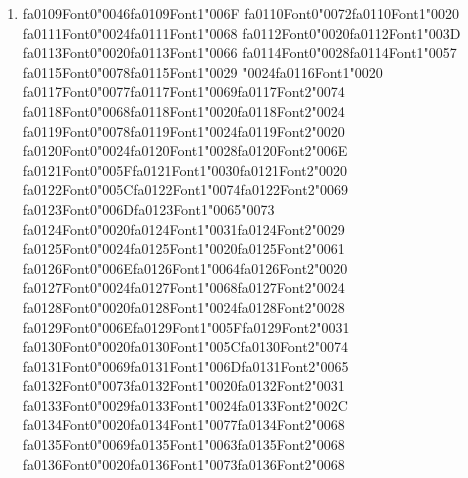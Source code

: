 \documentclass[12pt]{article}
\begin{document}
\begin{enumerate}[label=Q\arabic*.]
\begin{enumerate}[label=(\Alph*)]
    \item All future inputs
\end{enumerate}
\item {\csname fa0109Font0\endcsname\char"0046}{\csname fa0109Font1\endcsname\char"006F} {\csname fa0110Font0\endcsname\char"0072}{\csname fa0110Font1\endcsname\char"0020} {\csname fa0111Font0\endcsname\char"0024}{\csname fa0111Font1\endcsname\char"0068} {\csname fa0112Font0\endcsname\char"0020}{\csname fa0112Font1\endcsname\char"003D} {\csname fa0113Font0\endcsname\char"0020}{\csname fa0113Font1\endcsname\char"0066} {\csname fa0114Font0\endcsname\char"0028}{\csname fa0114Font1\endcsname\char"0057} {\csname fa0115Font0\endcsname\char"0078}{\csname fa0115Font1\endcsname\char"0029} {\char"0024}{\csname fa0116Font1\endcsname\char"0020} {\csname fa0117Font0\endcsname\char"0077}{\csname fa0117Font1\endcsname\char"0069}{\csname fa0117Font2\endcsname\char"0074} {\csname fa0118Font0\endcsname\char"0068}{\csname fa0118Font1\endcsname\char"0020}{\csname fa0118Font2\endcsname\char"0024} {\csname fa0119Font0\endcsname\char"0078}{\csname fa0119Font1\endcsname\char"0024}{\csname fa0119Font2\endcsname\char"0020} {\csname fa0120Font0\endcsname\char"0024}{\csname fa0120Font1\endcsname\char"0028}{\csname fa0120Font2\endcsname\char"006E} {\csname fa0121Font0\endcsname\char"005F}{\csname fa0121Font1\endcsname\char"0030}{\csname fa0121Font2\endcsname\char"0020} {\csname fa0122Font0\endcsname\char"005C}{\csname fa0122Font1\endcsname\char"0074}{\csname fa0122Font2\endcsname\char"0069} {\csname fa0123Font0\endcsname\char"006D}{\csname fa0123Font1\endcsname\char"0065}{\char"0073} {\csname fa0124Font0\endcsname\char"0020}{\csname fa0124Font1\endcsname\char"0031}{\csname fa0124Font2\endcsname\char"0029} {\csname fa0125Font0\endcsname\char"0024}{\csname fa0125Font1\endcsname\char"0020}{\csname fa0125Font2\endcsname\char"0061} {\csname fa0126Font0\endcsname\char"006E}{\csname fa0126Font1\endcsname\char"0064}{\csname fa0126Font2\endcsname\char"0020} {\csname fa0127Font0\endcsname\char"0024}{\csname fa0127Font1\endcsname\char"0068}{\csname fa0127Font2\endcsname\char"0024} {\csname fa0128Font0\endcsname\char"0020}{\csname fa0128Font1\endcsname\char"0024}{\csname fa0128Font2\endcsname\char"0028} {\csname fa0129Font0\endcsname\char"006E}{\csname fa0129Font1\endcsname\char"005F}{\csname fa0129Font2\endcsname\char"0031} {\csname fa0130Font0\endcsname\char"0020}{\csname fa0130Font1\endcsname\char"005C}{\csname fa0130Font2\endcsname\char"0074} {\csname fa0131Font0\endcsname\char"0069}{\csname fa0131Font1\endcsname\char"006D}{\csname fa0131Font2\endcsname\char"0065} {\csname fa0132Font0\endcsname\char"0073}{\csname fa0132Font1\endcsname\char"0020}{\csname fa0132Font2\endcsname\char"0031} {\csname fa0133Font0\endcsname\char"0029}{\csname fa0133Font1\endcsname\char"0024}{\csname fa0133Font2\endcsname\char"002C} {\csname fa0134Font0\endcsname\char"0020}{\csname fa0134Font1\endcsname\char"0077}{\csname fa0134Font2\endcsname\char"0068} {\csname fa0135Font0\endcsname\char"0069}{\csname fa0135Font1\endcsname\char"0063}{\csname fa0135Font2\endcsname\char"0068} {\csname fa0136Font0\endcsname\char"0020}{\csname fa0136Font1\endcsname\char"0073}{\csname fa0136Font2\endcsname\char"0068} 
\end{enumerate}
\end{document}
